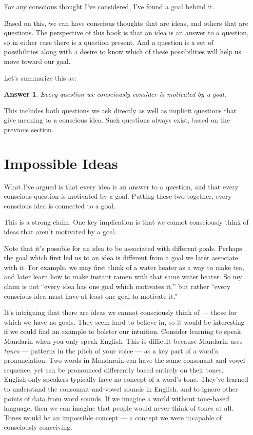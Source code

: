 \documentclass[9pt, twoside]{book}
\newtheorem*{answer}{Answer}
\theoremstyle{argtstyle}
\begin{document}
For any conscious thought I've considered, I've
found a goal behind it.

Based on this, we can have conscious thoughts that are ideas, and others that
are questions. The perspective of this book is that an idea is an answer to a
question, so in either case there is a question present. And a question is a set
of possibilities along with a desire to know which of these possibilities will
help us move toward our goal.

Let's summarize this as:
\begin{answer}
    Every question we consciously consider is motivated by a goal.
\end{answer}
This includes both questions we ask directly as well as
implicit questions that give meaning to a conscious idea.
Such questions always exist, based on the previous
section.

\section{Impossible Ideas}

What I've argued is that every idea is an answer to a question, and that every
conscious question is motivated by a goal. Putting these two together,
every
conscious idea is connected to a goal.

This is a strong claim. One key implication is that we cannot consciously
think of ideas that aren't motivated by a goal.

Note that it's possible for an idea to be associated with different goals.
Perhaps the goal which first led us to an idea is
different from a goal we later associate with it. For example, we may first
think of a water heater as a way to make tea, and later learn how to make
instant ramen with that same water heater.
So my claim is not ``every idea has one goal which motivates it,'' but rather
``every conscious idea must have at least one goal to motivate it.''

It's intriguing that there are ideas we cannot consciously think of ---
those for
which we have no goals. They seem hard to believe in, so it would be
interesting if we could find an example to bolster our intuition.
Consider learning to speak Mandarin when you only speak English.
This is difficult because Mandarin uses {\em tones} --- patterns in the pitch of
your voice --- as a key part of a word's pronunciation.
Two words in Mandarain can have
the same consonant-and-vowel sequence, yet can be
pronounced differently based entirely on their tones.
English-only speakers typically have no concept of a word's tone.
They've learned to understand the consonant-and-vowel sounds in English, and to
ignore other points of data from word sounds. If we imagine a world without
tone-based language, then we can imagine that people would never think of
tones at all. Tones would be an impossible concept --- a concept we were
incapable of consciously conceiving.
\end{document}
